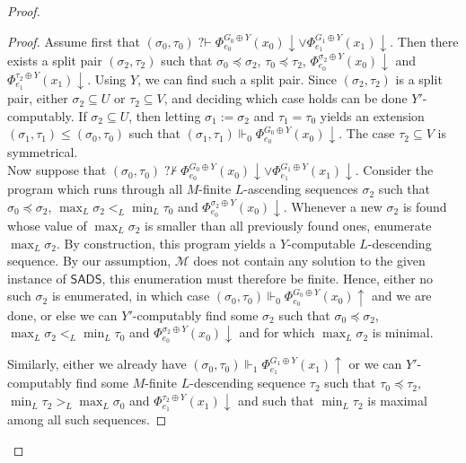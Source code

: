 \documentclass{article}
\numberwithin{theorem}{section}
\newcommand{\SADS}{\mathsf{SADS}}
\newcommand{\qvdash}{\operatorname{{?}{\vdash}}}
\newcommand{\nqvdash}{\operatorname{{?}{\nvdash}}}
\newcommand{\M}{\mathcal{M}}
\begin{document}
\begin{proof}
\begin{proof}
Assume first that $(\sigma_0, \tau_0) \qvdash \Phi_{e_0}^{G_0 \oplus Y}(x_0) \downarrow \vee \Phi_{e_1}^{G_1 \oplus Y}(x_1) \downarrow$. Then there exists a split pair $(\sigma_2, \tau_2)$ such that $\sigma_0 \preceq \sigma_2$, $\tau_0 \preceq \tau_2$, $\Phi_{e_0}^{\sigma_2 \oplus Y}(x_0)\downarrow$ and $\Phi_{e_1}^{\tau_2 \oplus Y}(x_1)\downarrow$. Using $Y$, we can find such a split pair. Since $(\sigma_2, \tau_2)$ is a split pair, either $\sigma_2 \subseteq U$ or $\tau_2 \subseteq V$, and deciding which case holds can be done $Y'$-computably. If $\sigma_2 \subseteq U$, then letting $\sigma_1 := \sigma_2$ and $\tau_1 = \tau_0$ yields an extension $(\sigma_1, \tau_1) \leq (\sigma_0, \tau_0)$ such that $(\sigma_1, \tau_1) \Vdash_0 \Phi_{e_0}^{G_0 \oplus Y}(x_0) \downarrow$. The case $\tau_2 \subseteq V$ is symmetrical.  \\

Now suppose that $(\sigma_ 0, \tau_ 0) \nqvdash \Phi_{e_0}^{G_0 \oplus Y}(x_0) \downarrow \vee \Phi_{e_1}^{G_1 \oplus Y}(x_1) \downarrow$. Consider the program which runs through all $M$-finite $L$-ascending sequences $\sigma_2$ such that $\sigma_ 0 \preceq \sigma_2$, $\max_L \sigma_2 <_L \min_L \tau_0$ and $\Phi_{e_0}^{\sigma_2 \oplus Y}(x_0) \downarrow$. Whenever a new $\sigma_2$ is found whose value of $\max_L \sigma_2$ is smaller than all previously found ones, enumerate $\max_L \sigma_2$. By construction, this program yields a $Y$-computable $L$-descending sequence. By our assumption, $\M$ does not contain any solution to the given instance of $\SADS$, this enumeration must therefore be finite. Hence, either no such $\sigma_2$ is enumerated, in which case $(\sigma_ 0, \tau_ 0) \Vdash_0 \Phi_{e_0}^{G_0 \oplus Y}(x_0) \uparrow$ and we are done, or else we can $Y'$-computably find some $\sigma_2$ such that $\sigma_0 \preceq \sigma_2$, $\max_L \sigma_2 <_L \min_L \tau_0$ and $\Phi_{e_0}^{\sigma_2 \oplus Y}(x_0) \downarrow$ and for which $\max_L \sigma_2$ is minimal. 

Similarly, either we already have $(\sigma_ 0, \tau_ 0) \Vdash_1 \Phi_{e_1}^{G_1 \oplus Y}(x_1) \uparrow$ or we can $Y'$-computably find some $M$-finite $L$-descending sequence $\tau_2$ such that $\tau_0 \preceq \tau_2$, $\min_L \tau_2 >_L \max_L \sigma_0$ and $\Phi_{e_1}^{\tau_2 \oplus Y}(x_1) \downarrow$ and such that $\min_L \tau_2$ is maximal among all such sequences. 


\end{proof}
\end{proof}
\end{document}
